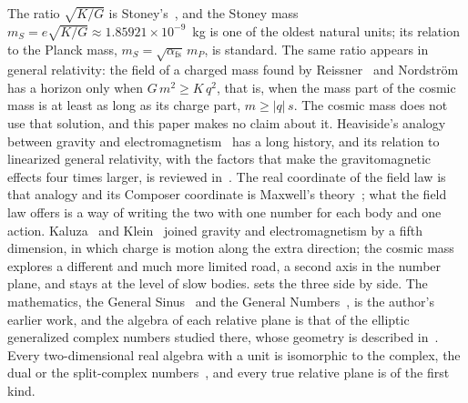 The ratio $\sqrt{K/G}$ is Stoney's~\citep{Stoney1881}, and the Stoney mass $m_S = e\sqrt{K/G} \approx 1.85921 \times 10^{-9}$~kg is one of the oldest natural units; its relation to the Planck mass, $m_S = \sqrt{\alpha_{\mathrm{fs}}}\,m_P$, is standard. The same ratio appears in general relativity: the field of a charged mass found by Reissner~\citep{Reissner1916} and Nordstr\"om~\citep{Nordstrom1918} has a horizon only when $G\,m^2 \ge K\,q^2$, that is, when the mass part of the cosmic mass is at least as long as its charge part, $m \ge \lvert q\rvert\,s$. The cosmic mass does not use that solution, and this paper makes no claim about it. Heaviside's analogy between gravity and electromagnetism~\citep{Heaviside1893} has a long history, and its relation to linearized general relativity, with the factors that make the gravitomagnetic effects four times larger, is reviewed in~\citep{Mashhoon2003}. The real coordinate of the field law is that analogy and its Composer coordinate is Maxwell's theory~\citep{Maxwell1865}; what the field law offers is a way of writing the two with one number for each body and one action. Kaluza~\citep{Kaluza1921} and Klein~\citep{Klein1926} joined gravity and electromagnetism by a fifth dimension, in which charge is motion along the extra direction; the cosmic mass explores a different and much more limited road, a second axis in the number plane, and stays at the level of slow bodies.  sets the three side by side. The mathematics, the General Sinus~\citep{Derraz2026GSP} and the General Numbers~\citep{DerrazGN2026}, is the author's earlier work, and the algebra of each relative plane is that of the elliptic generalized complex numbers studied there, whose geometry is described in~\citep{Yaglom1968,HarkinHarkin2004}. Every two-dimensional real algebra with a unit is isomorphic to the complex, the dual or the split-complex numbers~\citep{KantorSolodovnikov1989}, and every true relative plane is of the first kind.

